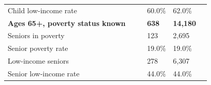 \documentclass[9pt]{report}
\begin{document}
\begin{tabular}{p{.10in}p{.10in}p{.10in}p{3.7in}>{\hfill}p{.85in}>{\hfill}p{.85in}>{\hfill}p{.85in}>{\hfill}p{.85in}p{0.1in}}
\multicolumn{4}{l}{\parbox{3.6in}{\strut\raggedright{{Child low-income rate}}\strut}} &  &  & 60.0\% & 62.0\% & \multicolumn{1}{l}{}  \\ 
\multicolumn{4}{l}{\parbox{3.5in}{\strut\raggedright{\textbf{Ages 65+, poverty status known}\strut}}} & \textbf{} & \textbf{} & \textbf{638} & \textbf{14,180} & \textbf{} \\ 
\multicolumn{4}{l}{\parbox{3.6in}{\strut\raggedright{{Seniors in poverty}}\strut}} &  &  & 123 & 2,695 & \multicolumn{1}{l}{}  \\ 
\multicolumn{4}{l}{\parbox{3.6in}{\strut\raggedright{{Senior poverty rate}}\strut}} &  &  & 19.0\% & 19.0\% & \multicolumn{1}{l}{}  \\ 
\multicolumn{4}{l}{\parbox{3.6in}{\strut\raggedright{{Low-income seniors}}\strut}} &  &  & 278 & 6,307 & \multicolumn{1}{l}{}  \\ 
\multicolumn{4}{l}{\parbox{3.6in}{\strut\raggedright{{Senior low-income rate}}\strut}} &  &  & 44.0\% & 44.0\% & \multicolumn{1}{l}{}  \\ 

\end{tabular}
\setlength{\tabcolsep}{6pt} %
\end{document}
